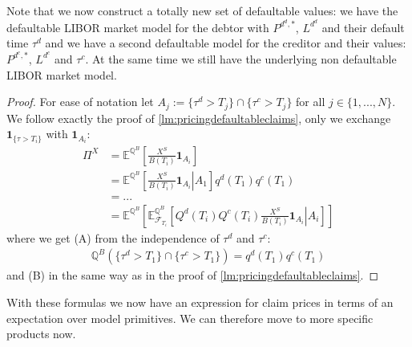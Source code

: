 \documentclass[12pt]{article}
\begin{document}
	Note that we now construct a totally new set of defaultable values: we have the defaultable LIBOR market model for the debtor with $P^{d^d,*}$, $L^{d^d}$ and their default time $\tau^d$ and we have a second defaultable model for the creditor and their values: $P^{d^c,*}$, $L^{d^c}$ and $\tau^c$. At the same time we still have the underlying non defaultable LIBOR market model.
	\begin{proof}
		For ease of notation let $A_j := \{\tau^d > T_j\} \cap\{\tau^c > T_j\}$ for all $j \in \{1, ..., N\}$.
		We follow exactly the proof of \cref{lm:pricingdefaultableclaims}, only we exchange $\mathbf{1}_{\{\tau > T_i\}}$ with $\mathbf{1}_{A_i}$:
		\begin{align*}
			\Pi^X &=  \mathbb{E}^{\mathbb{Q}^B}\left[\frac{X^S}{B(T_i)} \mathbf{1}_{A_i} \right]\\
		 	&=
		 	\mathbb{E}^{\mathbb{Q}^B}\left[\left.\frac{X^S}{B(T_i)} \mathbf{1}_{A_i} \right| A_1 \right]q^d(T_1)q^c(T_1)\tag{A}\\
		 	&=...\\
		 	&= \mathbb{E}^{\mathbb{Q}^B}\left[\mathbb{E}^{\mathbb{Q}^B}_{\mathcal{F}_{T_i}}\left[\left.Q^d(T_i)Q^c(T_i)\frac{X^S}{B(T_i)} \mathbf{1}_{A_i} \right| A_i \right]\right]\tag{B}
		\end{align*}
		where we get (A) from the independence of $\tau^d$ and $\tau^c$:
		\begin{align*}
		 	\mathbb{Q}^B\left(\{\tau^d > T_1\} \cap\{\tau^c > T_1\}\right) = q^d(T_1)q^c(T_1)
		\end{align*}
		and (B) in the same way as in the proof of \cref{lm:pricingdefaultableclaims}.
	\end{proof}
	
	
	With these formulas we now have an expression for claim prices in terms of an expectation over model primitives. We can therefore move to more specific products now.
	
\end{document}
